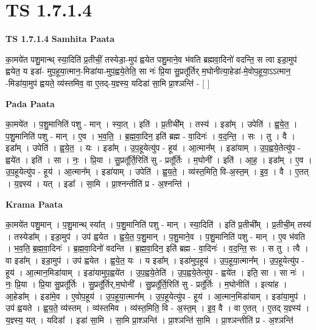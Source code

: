 \documentclass[17pt]{extarticle}
\begin{document}
\section*{ TS 1.7.1.4 }

\textbf{TS 1.7.1.4 } \newline
\textbf{Samhita Paata} \newline

का॒मये॑त पशु॒मान्थ् स्या॒दिति॑ प्र॒तीचीं॒ तस्येडा॒-मुप॑ ह्वयेत पशु॒माने॒व भ॑वति ब्रह्मवा॒दिनो॑ वदन्ति॒ स त्वा इडा॒मुप॑ ह्वयेत॒ य इडा॑- मुप॒हूया॒त्मान॒-मिडा॑या-मुप॒ह्वये॒तेति॒ सा नः॑ प्रि॒या सु॒प्रतू᳚र्तिर् म॒घोनीत्या॒हेडा॑-मे॒वोप॒हूया॒ऽऽत्मान॒ -मिडा॑या॒मुप॑ ह्वयते॒ व्य॑स्तमिव॒ वा ए॒तद्-य॒ज्ञ्स्य॒ यदिडा॑ सा॒मि प्रा॒श्ञन्ति॑ - [ ] \newline

\textbf{Pada Paata} \newline

का॒मये॑त । प॒शु॒मानिति॑ पशु - मान् । स्या॒त् । इति॑ । प्र॒तीची᳚म् । तस्य॑ । इडा᳚म् । उपेति॑ । ह्व॒ये॒त॒ । प॒शु॒मानिति॑ पशु - मान् । ए॒व । भ॒व॒ति॒ । ब्र॒ह्म॒वा॒दिन॒ इति॑ ब्रह्म - वा॒दिनः॑ । व॒द॒न्ति॒ । सः । तु । वै । इडा᳚म् । उपेति॑ । ह्व॒ये॒त॒ । यः । इडा᳚म् । उ॒प॒हूयेत्यु॑प - हूय॑ । आ॒त्मान᳚म् । इडा॑याम् । उ॒प॒ह्वये॒तेत्यु॑प - ह्वये॑त । इति॑ । सा । नः॒ । प्रि॒या । सु॒प्रतू᳚र्ति॒रिति॑ सु - प्रतू᳚र्तिः । म॒घोनी᳚ । इति॑ । आ॒ह॒ । इडा᳚म् । ए॒व । उ॒प॒हूयेत्यु॑प - हूय॑ । आ॒त्मान᳚म् । इडा॑याम् । उपेति॑ । ह्व॒य॒ते॒ । व्य॑स्त॒मिति॒ वि-अ॒स्त॒म् । इ॒व॒ । वै । ए॒तत् । य॒ज्ञ्स्य॑ । यत् । इडा᳚ । सा॒मि । प्रा॒श्नन्तीति॑ प्र - अ॒श्नन्ति॑ ।  \newline


\textbf{Krama Paata} \newline

का॒मये॑त पशु॒मान् । प॒शु॒मान्थ् स्या᳚त् । प॒शु॒मानिति॑ पशु - मान् । स्या॒दिति॑ । इति॑ प्र॒तीची᳚म् । प्र॒तीची॒म् तस्य॑ । तस्येडा᳚म् । इडा॒मुप॑ । उप॑ ह्वयेत । ह्व॒ये॒त॒ प॒शु॒मान् । प॒शु॒माने॒व । प॒शु॒मानिति॑ पशु - मान् । ए॒व भ॑वति । भ॒व॒ति॒ ब्र॒ह्म॒वा॒दिनः॑ । ब्र॒ह्म॒वा॒दिनो॑ वदन्ति । ब्र॒ह्म॒वा॒दिन॒ इति॑ ब्रह्म - वा॒दिनः॑ । व॒द॒न्ति॒ सः । स तु । त्वै । वा इडा᳚म् । इडा॒मुप॑ । उप॑ ह्वयेत । ह्व॒ये॒त॒ यः । य इडा᳚म् । इडा॑मुप॒हूय॑ । उ॒प॒हूया॒त्मान᳚म् । उ॒प॒हूयेत्यु॑प - हूय॑ । आ॒त्मान॒मिडा॑याम् । इडा॑यामुप॒ह्वये॑त । उ॒प॒ह्वये॒तेति॑ । उ॒प॒ह्वये॒तेत्यु॑प - ह्वये॑त । इति॒ सा । सा नः॑ । नः॒ प्रि॒या । प्रि॒या सु॒प्रतू᳚र्तिः । सु॒प्रतू᳚र्तिर्,म॒घोनी᳚ । सु॒प्रतू᳚र्ति॒रिति॑ सु - प्रतू᳚र्तिः । म॒घोनीति॑ । इत्या॑ह । आ॒हेडा᳚म् । इडा॑मे॒व । ए॒वोप॒हूय॑ । उ॒प॒हूया॒त्मान᳚म् । उ॒प॒हूयेत्यु॑प - हूय॑ । आ॒त्मान॒मिडा॑याम् । इडा॑या॒मुप॑ । उप॑ ह्वयते । ह्व॒य॒ते॒ व्य॑स्तम् । व्य॑स्तमिव । व्य॑स्त॒मिति॒ वि - अ॒स्त॒म् । इ॒व॒ वै । वा ए॒तत् । ए॒तद् य॒ज्ञ्स्य॑ । य॒ज्ञ्स्य॒ यत् । यदिडा᳚ । इडा॑ सा॒मि । सा॒मि प्रा॒श्ञन्ति॑ । प्रा॒श्ञन्ति॑ सा॒मि । प्रा॒श्ञन्तीति॑ प्र - अ॒श्ञन्ति॑ \newline
\end{document}
